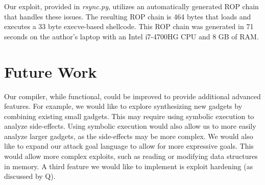 \documentclass[journal]{IEEEtran}
\begin{document}
Our exploit, provided in \emph{rsync.py}, utilizes an automatically generated ROP chain that handles these issues.
The resulting ROP chain is 464 bytes that loads and executes a 33 byte execve-based shellcode.
This ROP chain was generated in 71 seconds on the author's laptop with an Intel i7-4700HG CPU and 8 GB of RAM.

\section{Future Work}
Our compiler, while functional, could be improved to provide additional advanced
features. For example, we would like to explore synthesizing new gadgets by
combining existing small gadgets. This may require using symbolic execution to
analyze side-effects. Using symbolic execution would also allow us to more
easily analyze larger gadgets, as the side-effects may be more complex. We would
also like to expand our attack goal language to allow for more expressive goals.
This would allow more complex exploits, such as reading or modifying data
structures in memory. A third feature we would like to implement is exploit
hardening (as discussed by Q).


{}
\end{document}
